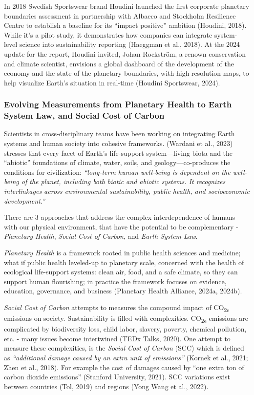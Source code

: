 \documentclass[
  12pt,
  letterpaper,
  DIV=11,
  numbers=noendperiod]{scrartcl}
\begin{document}
In 2018 Swedish Sportswear brand Houdini launched the first corporate
planetary boundaries assessment in partnership with Albaeco and
Stockholm Resilience Centre to establish a baseline for its ``impact
positive'' ambition (Houdini, 2018). While it's a pilot study, it
demonstrates how companies can integrate system-level science into
sustainability reporting (Haeggman et al., 2018). At the 2024 update for
the report, Houdini invited, Johan Rockström, a renown conservation and
climate scientist, envisions a global dashboard of the development of
the economy and the state of the planetary boundaries, with high
resolution maps, to help visualize Earth's situation in real-time
(Houdini Sportswear, 2024).

\subsubsection{Evolving Measurements from Planetary Health to Earth
System Law, and Social Cost of
Carbon}\label{evolving-measurements-from-planetary-health-to-earth-system-law-and-social-cost-of-carbon}

Scientists in cross-disciplinary teams have been working on integrating
Earth systems and human society into cohesive frameworks. (Wardani et
al., 2023) stresses that every facet of Earth's life-support
system---living biota and the ``abiotic'' foundations of climate, water,
soils, and geology---co-produces the conditions for civilization:
\emph{``long-term human well-being is dependent on the well-being of the
planet, including both biotic and abiotic systems. It recognizes
interlinkages across environmental sustainability, public health, and
socioeconomic development.''}

There are 3 approaches that address the complex interdependence of
humans with our physical environment, that have the potential to be
complementary - \emph{Planetary Health}, \emph{Social Cost of Carbon},
and \emph{Earth System Law}.

\emph{Planetary Health} is a framework rooted in public health sciences
and medicine; what if public health leveled-up to planetary scale,
concerned with the health of ecological life-support systems: clean air,
food, and a safe climate, so they can support human flourishing; in
practice the framework focuses on evidence, education, governance, and
business (Planetary Health Alliance, 2024a, 2024b).

\emph{Social Cost of Carbon} attempts to measures the compound impact of
CO\textsubscript{2e} emissions on society. Sustainability is filled with
complexities. CO\textsubscript{2e} emissions are complicated by
biodiversity loss, child labor, slavery, poverty, chemical pollution,
etc. - many issues become intertwined (TEDx Talks, 2020). One attempt to
measure these complexities, is the \emph{Social Cost of Carbon} (SCC)
which is defined as \emph{``additional damage caused by an extra unit of
emissions''} (Kornek et al., 2021; Zhen et al., 2018). For example the
cost of damages caused by ``one extra ton of carbon dioxide emissions''
(Stanford University, 2021). SCC variations exist between countries
(Tol, 2019) and regions (Yong Wang et al., 2022).
\end{document}

